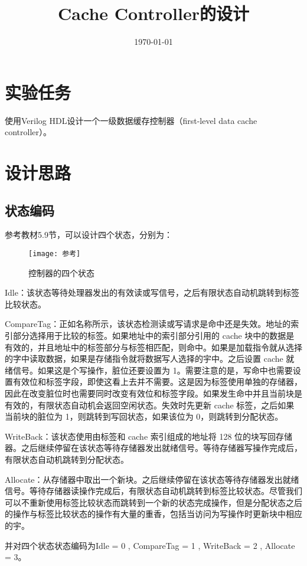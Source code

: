 \documentclass{../source/Experiment}
\title{Cache Controller的设计}
\date{\today}
\begin{document}
\makecover
\makeheader
\section{实验任务}
使用Verilog HDL设计一个一级数据缓存控制器（first-level  data  cache  controller）。
\section{设计思路}
\subsection{状态编码}
参考教材5.9节，可以设计四个状态，分别为：
\begin{figure}[H]
    \centering
    \texttt{[image: 参考]}
    \caption{控制器的四个状态}
\end{figure}

Idle：该状态等待处理器发出的有效读或写信号，之后有限状态自动机跳转到标签比较状态。

CompareTag：正如名称所示，该状态检测读或写请求是命中还是失效。地址的索引部分选择用于比较的标签。如果地址中的索引部分引用的 cache 块中的数据是有效的，并且地址中的标签部分与标签相匹配，则命中。如果是加载指令就从选择的字中读取数据，如果是存储指令就将数据写人选择的宇中。之后设置 cache 就绪信号。如果这是个写操作，脏位还要设置为 1。需要注意的是，写命中也需要设置有效位和标签字段，即使这看上去并不需要。这是因为标签使用单独的存储器，因此在改变脏位时也需要同时改变有效位和标签字段。如果发生命中并且当前块是有效的，有限状态自动机会返回空闲状态。失效时先更新 cache 标签，之后如果当前块的脏位为 1，则跳转到写回状态，如果该位为 0，则跳转到分配状态。

WriteBack：该状态使用由标签和 cache 索引组成的地址将 128 位的块写回存储器。之后继续停留在该状态等待存储器发出就绪信号。等待存储器写操作完成后，有限状态自动机跳转到分配状态。

Allocate：从存储器中取出一个新块。之后继续停留在该状态等待存储器发出就绪信号。等待存储器读操作完成后，有限状态自动机跳转到标签比较状态。尽管我们可以不重新使用标签比较状态而跳转到一个新的状态完成操作，但是分配状态之后的操作与标签比较状态的操作有大量的重香，包括当访问为写操作时更新块中相应的宇。

并对四个状态状态编码为Idle = 0 , CompareTag = 1 , WriteBack = 2 , Allocate = 3。
\end{document}
